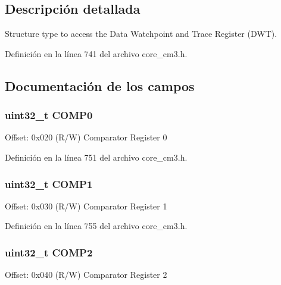 \subsection{Descripción detallada}
Structure type to access the Data Watchpoint and Trace Register (D\+WT). 

Definición en la línea 741 del archivo core\+\_\+cm3.\+h.



\subsection{Documentación de los campos}
\subsubsection[{\texorpdfstring{C\+O\+M\+P0}{COMP0}}]{ uint32\+\_\+t C\+O\+M\+P0}\hypertarget{struct_d_w_t___type_a00be2e0bf3e38ab6f33f8349d9e7a200}{}\label{struct_d_w_t___type_a00be2e0bf3e38ab6f33f8349d9e7a200}
Offset\+: 0x020 (R/W) Comparator Register 0 

Definición en la línea 751 del archivo core\+\_\+cm3.\+h.

\subsubsection[{\texorpdfstring{C\+O\+M\+P1}{COMP1}}]{ uint32\+\_\+t C\+O\+M\+P1}\hypertarget{struct_d_w_t___type_a711f336367372393a5f874e5c46e2b95}{}\label{struct_d_w_t___type_a711f336367372393a5f874e5c46e2b95}
Offset\+: 0x030 (R/W) Comparator Register 1 

Definición en la línea 755 del archivo core\+\_\+cm3.\+h.

\subsubsection[{\texorpdfstring{C\+O\+M\+P2}{COMP2}}]{ uint32\+\_\+t C\+O\+M\+P2}\hypertarget{struct_d_w_t___type_a5f159cd97def70baad2faa8d250bb86a}{}\label{struct_d_w_t___type_a5f159cd97def70baad2faa8d250bb86a}
Offset\+: 0x040 (R/W) Comparator Register 2 

